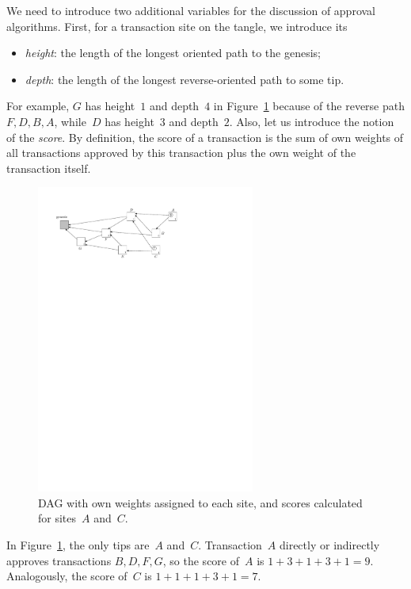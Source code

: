 \documentclass[12pt]{article}
\begin{document}
\begin{CJK}{UTF8}{bkai}
We need 
to introduce two additional variables for the discussion 
of approval algorithms.
First, for a transaction site on the tangle, 
we introduce its
\begin{itemize}
 \item \emph{height}: the length of the longest
oriented path to the genesis;
 \item \emph{depth}: the length of the longest
reverse-oriented path to some tip.
\end{itemize}
For example, 
$G$ has 
height~$1$ and depth~$4$ 
in Figure~\ref{f_reverse_weights}
because of the reverse 
 path $F,D,B,A$, 
while~$D$ has height~$3$ and depth~$2$.
Also, let us introduce the notion of the \emph{score}.
By definition, the score of a transaction
 is the sum of own weights of all transactions approved by this 
transaction plus
 the own weight of the transaction itself.
\begin{figure}
 \centering \includegraphics[width=0.64\textwidth]{reverse_weights} 
\caption{
DAG with own weights assigned to each site, 
and scores calculated for sites~$A$ and~$C$.}
\label{f_reverse_weights}
\end{figure}
In Figure~\ref{f_reverse_weights},
the only 
tips are~$A$ and~$C$.
Transaction~$A$ directly or indirectly approves 
transactions $B,D,F,G$, so the score of~$A$
is $1+3+1+3+1=9$. Analogously, the score
of~$C$ is $1+1+1+3+1=7$.


\end{CJK}
\end{document}
